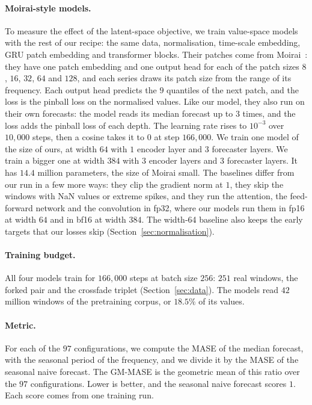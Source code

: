 \paragraph{Moirai-style models.}
To measure the effect of the latent-space objective, we train
value-space models with the rest of our recipe: the same data,
normalisation, time-scale embedding, GRU patch embedding and
transformer blocks. Their patches come from
Moirai~\citep{woo2024moirai}: they have one patch embedding and one
output head for each of the patch sizes $8$, $16$, $32$, $64$ and
$128$, and each series draws its patch size from the range of its
frequency.
Each output head predicts the $9$ quantiles of the next patch, and the
loss is the pinball loss on the normalised values. Like our model,
they also run on their own forecasts: the model reads its median
forecast up to $3$ times, and the loss adds the pinball loss of each
depth. The learning rate rises to $10^{-3}$ over $10{,}000$ steps,
then a cosine takes it to $0$ at step $166{,}000$. We train one model
of the size of ours, at width $64$ with $1$ encoder layer and $3$
forecaster layers. We train a bigger one at width $384$ with $3$
encoder layers and $3$ forecaster layers. It has $14.4$ million
parameters, the size of Moirai small. The baselines differ from our
run in a few more ways: they clip the gradient norm at $1$, they skip
the windows with NaN values or extreme spikes, and they run the
attention, the feed-forward network and the convolution in fp32,
where our models run them in fp16 at width $64$ and in bf16 at width
$384$. The width-64 baseline also keeps
the early targets that our losses skip
(Section~\ref{sec:normalisation}).

\paragraph{Training budget.}
All four models train for $166{,}000$ steps at batch size $256$:
$251$ real windows, the forked pair and the crossfade triplet
(Section~\ref{sec:data}). The models read $42$ million windows of the
pretraining corpus, or $18.5\%$ of its values.

\paragraph{Metric.}
For each of the $97$ configurations, we compute the MASE of the median
forecast, with the seasonal period of the frequency, and we divide it
by the MASE of the seasonal naive forecast. The GM-MASE is the
geometric mean of this ratio over the $97$ configurations. Lower is
better, and the seasonal naive forecast scores $1$. Each score comes
from one training run.
